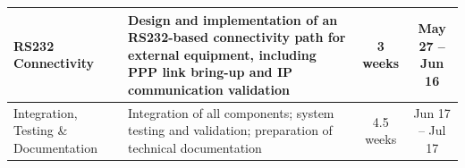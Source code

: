 \begin{table}[htbp]
\begin{tabular}{|p{3cm}|p{8cm}|c|c|}
            \hline
            \gls{RS232} Connectivity                                             &
            Design and implementation of an \gls{RS232}-based connectivity path
            for external equipment, including \gls{PPP} link bring-up and IP
            communication validation                                             &
            3 weeks                                                              & May 27 -- Jun 16                    \\
            \hline
            Integration, Testing \& Documentation                                &
            Integration of all components; system testing and validation;
            preparation of technical documentation                               &
            4.5 weeks                                                            & Jun 17 -- Jul 17                    \\
            \hline
      \end{tabular}
\end{table}

